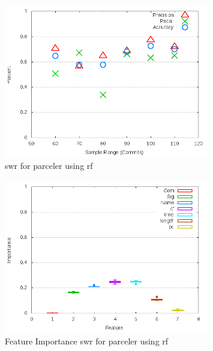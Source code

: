 \begin{figure}[!t]
\centering
\includegraphics[width=0.8\textwidth]{images/rf/test_1/parceler_sample_range.png}
\caption{\gls{swr} for parceler using \gls{rf}}
\label{fig:test_1_parceler_rf}
\end{figure}

\begin{figure}[!t]
\centering
\includegraphics[width=0.8\textwidth]{images/rf/test_1/parceler_importance.png}
\caption{Feature Importance \gls{swr} for parceler using \gls{rf}}
\label{fig:test_1_parceler_rf_importance}
\end{figure}

